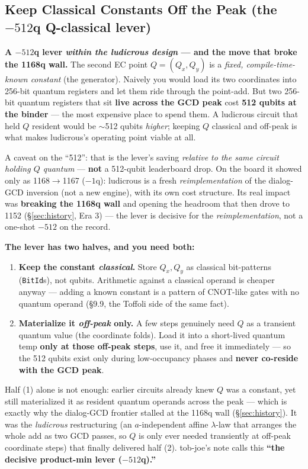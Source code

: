 \documentclass[11pt,a4paper]{article}
\begin{document}
\subsection{Keep Classical Constants Off the Peak (the $-512$q Q-classical lever)}
\label{sec:qclassical}

\textbf{A $-512$q lever \emph{within the ludicrous design} --- and the move that broke the 1168q wall.}
The second EC point $Q = (Q_x, Q_y)$ is a \emph{fixed, compile-time-known constant} (the generator).
Naively you would load its two coordinates into 256-bit quantum registers and let them ride through
the point-add. But two 256-bit quantum registers that sit \textbf{live across the GCD peak} cost
\textbf{512 qubits at the binder} --- the most expensive place to spend them. A ludicrous circuit that
held $Q$ resident would be $\sim$512 qubits \emph{higher}; keeping $Q$ classical and off-peak is what
makes ludicrous's operating point viable at all.

A caveat on the ``512'': that is the lever's saving \emph{relative to the same circuit holding $Q$
quantum} --- \textbf{not} a 512-qubit leaderboard drop. On the board it showed only as
1168$\to$1167 ($-1$q): ludicrous is a fresh \emph{reimplementation} of the dialog-GCD inversion (not a
new engine), with its own cost structure. Its real impact was \textbf{breaking the 1168q wall} and
opening the headroom that then drove to 1152 (\S\ref{sec:history}, Era 3) --- the lever is decisive
for the \emph{reimplementation}, not a one-shot $-512$ on the record.

\textbf{The lever has two halves, and you need both:}
\begin{enumerate}
  \item \textbf{Keep the constant \emph{classical}.} Store $Q_x, Q_y$ as classical bit-patterns
    (\texttt{BitId}s), not qubits. Arithmetic against a classical operand is cheaper anyway --- adding
    a known constant is a pattern of CNOT-like gates with no quantum operand (\S9.9, the Toffoli side
    of the same fact).
  \item \textbf{Materialize it \emph{off-peak} only.} A few steps genuinely need $Q$ as a transient
    quantum value (the coordinate folds). Load it into a short-lived quantum temp \textbf{only at those
    off-peak steps}, use it, and free it immediately --- so the 512 qubits exist only during
    low-occupancy phases and \textbf{never co-reside with the GCD peak}.
\end{enumerate}

Half (1) alone is not enough: earlier circuits already knew $Q$ was a constant, yet still materialized
it as resident quantum operands across the peak --- which is exactly why the dialog-GCD frontier
stalled at the 1168q wall (\S\ref{sec:history}). It was the \emph{ludicrous} restructuring (an
$a$-independent affine $\lambda$-law that arranges the whole add as two GCD passes, so $Q$ is only ever
needed transiently at off-peak coordinate steps) that finally delivered half (2). tob-joe's note calls
this \textbf{``the decisive product-min lever ($-512$q).''}
\end{document}
